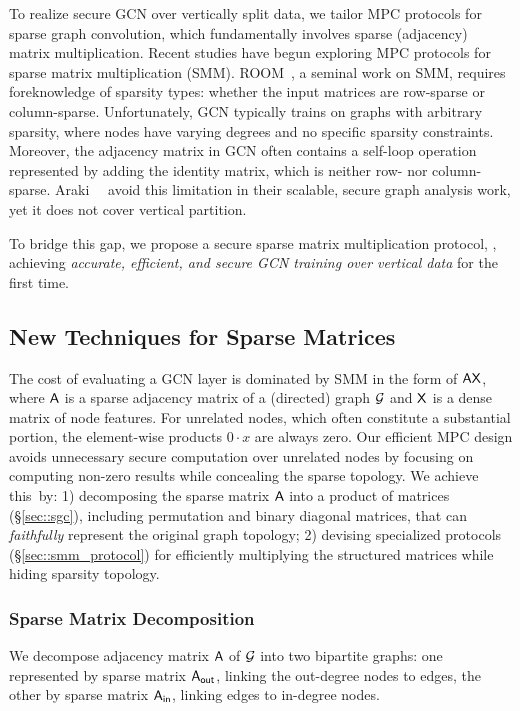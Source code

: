 To realize secure GCN over vertically split data, we tailor MPC protocols for sparse graph convolution, which fundamentally involves sparse (adjacency) matrix multiplication.
Recent studies have begun exploring MPC protocols for sparse matrix multiplication (SMM).
ROOM~\cite{ccs/SchoppmannG0P19}, a seminal work on SMM, requires foreknowledge of sparsity types: whether the input matrices are row-sparse or column-sparse.
Unfortunately, GCN typically trains on graphs with arbitrary sparsity, where nodes have varying degrees and no specific sparsity constraints.
Moreover, the adjacency matrix in GCN often contains a self-loop operation represented by adding the identity matrix, which is neither row- nor column-sparse.
Araki~\etal~\cite{ccs/Araki0OPRT21} avoid this limitation in their scalable, secure graph analysis work, yet it does not cover vertical partition.

To bridge this gap, we propose a secure sparse matrix multiplication protocol, \osmm, achieving \emph{accurate, efficient, and secure GCN training over vertical data} for the first time.

\subsection{New Techniques for Sparse Matrices}
The cost of evaluating a GCN layer is dominated by SMM in the form of $\mathsf{A}\mathsf{X}$, where $\mathsf{A}$ is a sparse adjacency matrix of a (directed) graph $\mathcal{G}$ and $\mathsf{X}$ is a dense matrix of node features.
For unrelated nodes, which often constitute a substantial portion, the element-wise products $0\cdot x$ are always zero.
Our efficient MPC design 
avoids unnecessary secure computation over unrelated nodes by focusing on computing non-zero results while concealing the sparse topology.
We achieve this~by:
1) decomposing the sparse matrix $\mathsf{A}$ into a product of matrices (\S\ref{sec::sgc}), including permutation and binary diagonal matrices, that can \emph{faithfully} represent the original graph topology;
2) devising specialized protocols (\S\ref{sec::smm_protocol}) for efficiently multiplying the structured matrices while hiding sparsity topology.


 
\subsubsection{Sparse Matrix Decomposition}
We decompose adjacency matrix $\mathsf{A}$ of $\mathcal{G}$ into two bipartite graphs: one represented by sparse matrix $\mathsf{A}_{\mathsf{out}}$, linking the out-degree nodes to edges, the other 
by sparse matrix $\mathsf{A}_{\mathsf{in}}$,
linking edges to in-degree nodes.


